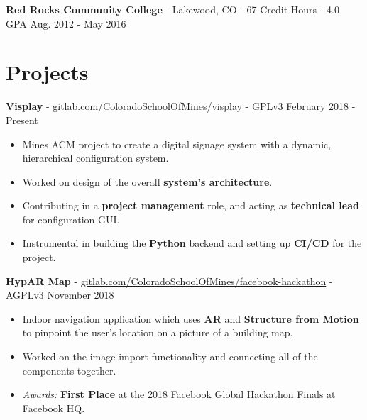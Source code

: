 \documentclass[10pt,letterpaper]{article}
\begin{document}
\vspace{2pt}
\textbf{Red Rocks Community College} - Lakewood, CO - 67 Credit Hours - 4.0 GPA
\hfill Aug. 2012 - May 2016

\section*{Projects}
\textbf{Visplay} -
\href{https://gitlab.com/ColoradoSchoolOfMines/visplay}{gitlab.com/ColoradoSchoolOfMines/visplay}
- GPLv3 \hfill February 2018 - Present
\begin{itemize}
    \item Mines ACM project to create a digital signage system with a dynamic,
        hierarchical configuration system.
    \item Worked on design of the overall \textbf{system's architecture}.
    \item Contributing in a \textbf{project management} role, and acting as
        \textbf{technical lead} for configuration GUI.
    \item Instrumental in building the \textbf{Python} backend and setting up
        \textbf{CI/CD} for the project.
\end{itemize}

\textbf{HypAR Map} -
\href{https://gitlab.com/ColoradoSchoolOfMines/facebook-hackathon}{gitlab.com/ColoradoSchoolOfMines/facebook-hackathon}
- AGPLv3 \hfill November 2018
\begin{itemize}
    \item Indoor navigation application which uses \textbf{AR} and
        \textbf{Structure from Motion} to pinpoint the user's location on a
        picture of a building map.
    \item Worked on the image import functionality and connecting all of the
        components together.
    \item \textit{Awards:} \textbf{First Place} at the 2018 Facebook Global
        Hackathon Finals at Facebook HQ.
\end{itemize}

\end{document}
